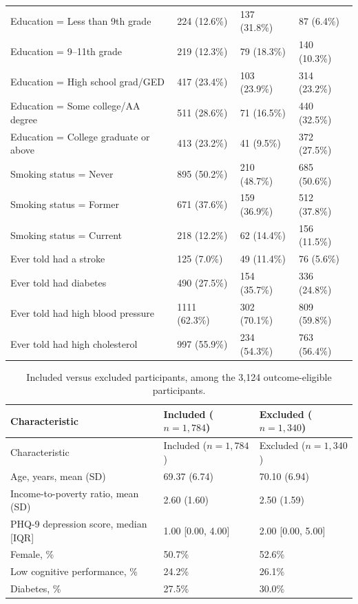 \documentclass[12pt]{article}
\begin{document}
\begin{singlespace}
\begin{longtable}{p{6.6cm}R{2.6cm}R{2.6cm}R{2.6cm}}
Education = Less than 9th grade & 224 (12.6\%) & 137 (31.8\%) & 87 (6.4\%) \\
Education = 9--11th grade & 219 (12.3\%) & 79 (18.3\%) & 140 (10.3\%) \\
Education = High school grad/GED & 417 (23.4\%) & 103 (23.9\%) & 314 (23.2\%) \\
Education = Some college/AA degree & 511 (28.6\%) & 71 (16.5\%) & 440 (32.5\%) \\
Education = College graduate or above & 413 (23.2\%) & 41 (9.5\%) & 372 (27.5\%) \\
Smoking status = Never & 895 (50.2\%) & 210 (48.7\%) & 685 (50.6\%) \\
Smoking status = Former & 671 (37.6\%) & 159 (36.9\%) & 512 (37.8\%) \\
Smoking status = Current & 218 (12.2\%) & 62 (14.4\%) & 156 (11.5\%) \\
Ever told had a stroke & 125 (7.0\%) & 49 (11.4\%) & 76 (5.6\%) \\
Ever told had diabetes & 490 (27.5\%) & 154 (35.7\%) & 336 (24.8\%) \\
Ever told had high blood pressure & 1111 (62.3\%) & 302 (70.1\%) & 809 (59.8\%) \\
Ever told had high cholesterol & 997 (55.9\%) & 234 (54.3\%) & 763 (56.4\%) \\
\end{longtable}

\bigskip

\begin{longtable}{p{6.0cm}R{3.5cm}R{3.5cm}}
\caption{Included versus excluded participants, among the 3,124 outcome-eligible participants.}
\label{tab:t1b}\\
\toprule
Characteristic & Included ($n=1{,}784$) & Excluded ($n=1{,}340$) \\
\midrule
\endfirsthead
\toprule
Characteristic & Included ($n=1{,}784$) & Excluded ($n=1{,}340$) \\
\midrule
\endhead
\bottomrule
\endlastfoot
Age, years, mean (SD) & 69.37 (6.74) & 70.10 (6.94) \\
Income-to-poverty ratio, mean (SD) & 2.60 (1.60) & 2.50 (1.59) \\
PHQ-9 depression score, median [IQR] & 1.00 [0.00, 4.00] & 2.00 [0.00, 5.00] \\
Female, \% & 50.7\% & 52.6\% \\
Low cognitive performance, \% & 24.2\% & 26.1\% \\
Diabetes, \% & 27.5\% & 30.0\% \\
\end{longtable}

\end{singlespace}
\linenumbers
\end{document}

